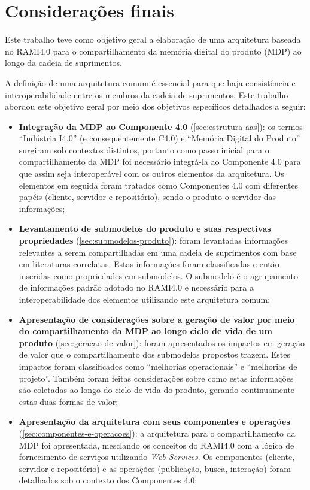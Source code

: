 \chapter{Considerações finais}
\label{cha:conclusao}

Este trabalho teve como objetivo geral a elaboração de uma arquitetura baseada no RAMI4.0 para o compartilhamento da memória digital do produto (MDP) ao longo da cadeia de suprimentos.

A definição de uma arquitetura comum é essencial para que haja consistência e interoperabilidade entre os membros da cadeia de suprimentos. Este trabalho abordou este objetivo geral por meio dos objetivos específicos detalhados a seguir:

\begin{itemize}
  \item \textbf{Integração da MDP ao Componente 4.0} (\autoref{sec:estrutura-aas}): os termos ``Indústria I4.0'' (e consequentemente C4.0) e ``Memória Digital do Produto'' surgiram sob contextos distintos, portanto como passo inicial para o compartilhamento da MDP foi necessário integrá-la ao Componente 4.0 para que assim seja interoperável com os outros elementos da arquitetura. Os elementos em seguida foram tratados como Componentes 4.0 com diferentes papéis (cliente, servidor e repositório), sendo o produto o servidor das informações;
  \item \textbf{Levantamento de submodelos do produto e suas respectivas propriedades} (\autoref{sec:submodelos-produto}): foram levantadas informações relevantes a serem compartilhadas em uma cadeia de suprimentos com base em literaturas correlatas. Estas informações foram classificadas e então inseridas como propriedades em submodelos. O submodelo é o agrupamento de informações padrão adotado no RAMI4.0 e necessário para a interoperabilidade dos elementos utilizando este arquitetura comum;
  \item \textbf{Apresentação de considerações sobre a geração de valor por meio do compartilhamento da MDP ao longo ciclo de vida de um produto} (\autoref{sec:geracao-de-valor}): foram apresentados os impactos em geração de valor que o compartilhamento dos submodelos propostos trazem. Estes impactos foram classificados como ``melhorias operacionais'' e ``melhorias de projeto''. Também foram feitas considerações sobre como estas informações são coletadas ao longo do ciclo de vida do produto, gerando continuamente estas duas formas de valor;
  \item \textbf{Apresentação da arquitetura com seus componentes e operações} (\autoref{sec:componentes-e-operacoes}): a arquitetura para o compartilhamento da MDP foi apresentada, mesclando os conceitos do RAMI4.0 com a lógica de fornecimento de serviços utilizando \textit{Web Services}. Os componentes (cliente, servidor e repositório) e as operações (publicação, busca, interação) foram detalhados sob o contexto dos Componentes 4.0;

\end{itemize}

